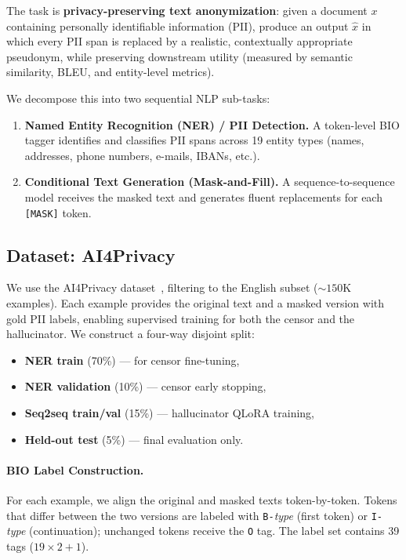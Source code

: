\documentclass[11pt, a4paper]{article}
\begin{document}
The task is \textbf{privacy-preserving text anonymization}: given a
document $x$ containing personally identifiable information (PII),
produce an output $\hat{x}$ in which every PII span is replaced by a
realistic, contextually appropriate pseudonym, while preserving
downstream utility (measured by semantic similarity, BLEU, and
entity-level metrics).

We decompose this into two sequential NLP sub-tasks:
\begin{enumerate}
  \item \textbf{Named Entity Recognition (NER) / PII Detection.}
        A token-level BIO tagger identifies and classifies PII spans
        across 19 entity types (names, addresses, phone numbers,
        e-mails, IBANs, etc.).
  \item \textbf{Conditional Text Generation (Mask-and-Fill).}
        A sequence-to-sequence model receives the masked text and
        generates fluent replacements for each \texttt{[MASK]} token.
\end{enumerate}

\subsection{Dataset: AI4Privacy}

We use the AI4Privacy dataset~\cite{pilán2022ai4privacy}, filtering
to the English subset (${\sim}150\text{K}$ examples).  Each example
provides the original text and a masked version with gold PII labels,
enabling supervised training for both the censor and the hallucinator.
We construct a four-way disjoint split:
\begin{itemize}
  \item \textbf{NER train} (70\%) --- for censor fine-tuning,
  \item \textbf{NER validation} (10\%) --- censor early stopping,
  \item \textbf{Seq2seq train/val} (15\%) --- hallucinator QLoRA training,
  \item \textbf{Held-out test} (5\%) --- final evaluation only.
\end{itemize}

\paragraph{BIO Label Construction.}
For each example, we align the original and masked texts token-by-token.
Tokens that differ between the two versions are labeled with
\texttt{B-}\emph{type} (first token) or \texttt{I-}\emph{type}
(continuation); unchanged tokens receive the \texttt{O} tag.
The label set contains 39 tags ($19 \times 2 + 1$).
\end{document}
